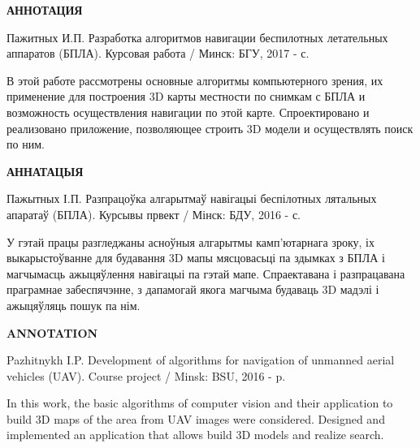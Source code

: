 \begin{center}
     \large\bfseries{АННОТАЦИЯ}
\end{center}

Пажитных И.П. Разработка алгоритмов навигации беспилотных летательных аппаратов (БПЛА). Курсовая работа / Минск: БГУ, 2017 - \pageref{LastPage} с.

В этой работе рассмотрены основные алгоритмы компьютерного зрения, их применение для построения 3D карты местности по снимкам с БПЛА и возможность осуществления навигации по этой карте. Спроектировано и реализовано приложение, позволяющее строить 3D модели и осуществлять поиск по ним.

\begin{center}
     \large\bfseries{АННАТАЦЫЯ}
\end{center}

Пажытных І.П. Разпрацоўка алгарытмаў навігацыі беспілотных лятальных апаратаў (БПЛА). Курсывы првект / Мінск: БДУ, 2016 - \pageref{LastPage} с.

У гэтай працы разгледжаны асноўныя алгарытмы камп'ютарнага зроку, іх выкарыстоўванне для будавання 3D мапы мясцовасьці па здымках з БПЛА і магчымасць ажыцяўлення навігацыі па гэтай мапе. Спраектавана і разпрацавана праграмнае забеспячэнне, з дапамогай якога магчыма будаваць 3D мадэлі і ажыцяўляць пошук па нім.

\begin{center}
     \large\bfseries{ANNOTATION}
\end{center}

Pazhitnykh I.P. Development of algorithms for navigation of unmanned aerial vehicles (UAV). Course project / Minsk: BSU, 2016 - \pageref{LastPage} p.

In this work, the basic algorithms of computer vision and their application to build 3D maps of the area from UAV images were considered. Designed and implemented an application that allows build 3D models and realize search.

\newpage
